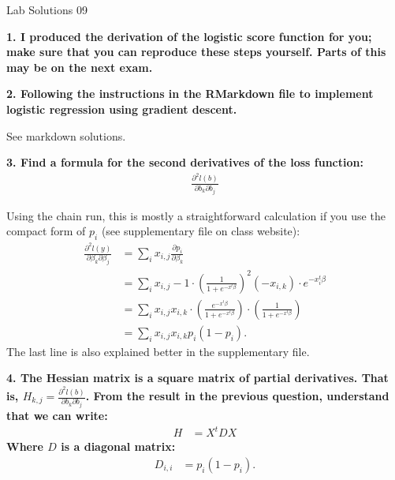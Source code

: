 \documentclass[12pt,hidelinks]{article}
\numberwithin{equation}{section}
\begin{document}
{\LARGE Lab Solutions 09}

\vspace*{12pt}

\textbf{1. I produced the derivation of the logistic score function for you; make
sure that you can reproduce these steps yourself. Parts of this may be on the
next exam.}

\vspace*{12pt}

\textbf{2. Following the instructions in the RMarkdown file to implement logistic
regression using gradient descent.}

\vspace*{12pt}

See markdown solutions.

\vspace*{12pt}

\textbf{3. Find a formula for the second derivatives of the loss function:}
\begin{align}
\frac{\partial^2 l(b)}{\partial b_k \partial b_j}
\end{align}

\vspace*{12pt}

Using the chain run, this is mostly a straightforward calculation if you use
the compact form of $p_i$ (see supplementary file on class website):
\begin{align}
\frac{\partial^2 l(y)}{\partial \beta_k \partial \beta_j}
&= \sum_i x_{i,j} \frac{\partial p_i}{\partial \beta_k} \\
&= \sum_i x_{i,j} -1 \cdot \left( \frac{1}{1 + e^{-x^t \beta}} \right)^2 (- x_{i, k}) \cdot e^{-x_i^t \beta} \\
&= \sum_i x_{i,j} x_{i,k} \cdot \left( \frac{e^{-x^t \beta}}{1 + e^{-x^t \beta}} \right) \cdot \left( \frac{1}{1 + e^{-x^t \beta}} \right) \\
&= \sum_i x_{i,j} x_{i,k} p_i (1 - p_i).
\end{align}
The last line is also explained better in the supplementary file.

\vspace*{12pt}

\textbf{4. The Hessian matrix is a square matrix of partial derivatives. That is,
$H_{k, j} = \frac{\partial^2 l(b)}{\partial b_k \partial b_j}$. From the result
in the previous question, understand that we can write:}
\begin{align}
H &= X^t D X
\end{align}
\textbf{Where $D$ is a diagonal matrix:}
\begin{align}
D_{i, i} &= p_i (1 - p_i).
\end{align}
\end{document}
